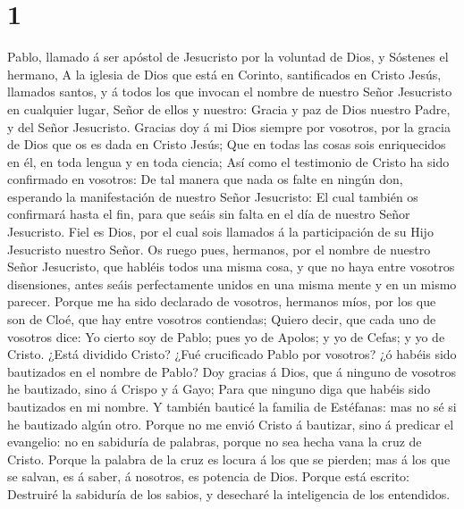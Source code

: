 \hypertarget{section}{%
\section{1}\label{section}}

 Pablo, llamado á ser apóstol de Jesucristo por la
voluntad de Dios, y Sóstenes el hermano,  A la iglesia de
Dios que está en Corinto, santificados en Cristo Jesús, llamados santos,
y á todos los que invocan el nombre de nuestro Señor Jesucristo en
cualquier lugar, Señor de ellos y nuestro:  Gracia y paz
de Dios nuestro Padre, y del Señor Jesucristo.  Gracias
doy á mi Dios siempre por vosotros, por la gracia de Dios que os es dada
en Cristo Jesús;  Que en todas las cosas sois enriquecidos
en él, en toda lengua y en toda ciencia;  Así como el
testimonio de Cristo ha sido confirmado en vosotros:  De
tal manera que nada os falte en ningún don, esperando la manifestación
de nuestro Señor Jesucristo:  El cual también os
confirmará hasta el fin, para que seáis sin falta en el día de nuestro
Señor Jesucristo.  Fiel es Dios, por el cual sois llamados
á la participación de su Hijo Jesucristo nuestro Señor. 
Os ruego pues, hermanos, por el nombre de nuestro Señor Jesucristo, que
habléis todos una misma cosa, y que no haya entre vosotros disensiones,
antes seáis perfectamente unidos en una misma mente y en un mismo
parecer.  Porque me ha sido declarado de vosotros,
hermanos míos, por los que son de Cloé, que hay entre vosotros
contiendas;  Quiero decir, que cada uno de vosotros dice:
Yo cierto soy de Pablo; pues yo de Apolos; y yo de Cefas; y yo de
Cristo.  ¿Está dividido Cristo? ¿Fué crucificado Pablo
por vosotros? ¿ó habéis sido bautizados en el nombre de Pablo?
 Doy gracias á Dios, que á ninguno de vosotros he
bautizado, sino á Crispo y á Gayo;  Para que ninguno diga
que habéis sido bautizados en mi nombre.  Y también
bauticé la familia de Estéfanas: mas no sé si he bautizado algún otro.
 Porque no me envió Cristo á bautizar, sino á predicar el
evangelio: no en sabiduría de palabras, porque no sea hecha vana la cruz
de Cristo.  Porque la palabra de la cruz es locura á los
que se pierden; mas á los que se salvan, es á saber, á nosotros, es
potencia de Dios.  Porque está escrito: Destruiré la
sabiduría de los sabios, y desecharé la inteligencia de los entendidos.
